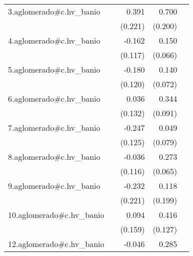 {\begin{longtable}{l*{4}{D{.}{.}{-1}}}
\addlinespace
3.aglomerado#c.hv\_banio&                     &       0.391         &       0.700\sym{***}&                     \\
            &                     &     (0.221)         &     (0.200)         &                     \\
\addlinespace
4.aglomerado#c.hv\_banio&                     &      -0.162         &       0.150\sym{*}  &                     \\
            &                     &     (0.117)         &     (0.066)         &                     \\
\addlinespace
5.aglomerado#c.hv\_banio&                     &      -0.180         &       0.140         &                     \\
            &                     &     (0.120)         &     (0.072)         &                     \\
\addlinespace
6.aglomerado#c.hv\_banio&                     &       0.036         &       0.344\sym{***}&                     \\
            &                     &     (0.132)         &     (0.091)         &                     \\
\addlinespace
7.aglomerado#c.hv\_banio&                     &      -0.247\sym{*}  &       0.049         &                     \\
            &                     &     (0.125)         &     (0.079)         &                     \\
\addlinespace
8.aglomerado#c.hv\_banio&                     &      -0.036         &       0.273\sym{***}&                     \\
            &                     &     (0.116)         &     (0.065)         &                     \\
\addlinespace
9.aglomerado#c.hv\_banio&                     &      -0.232         &       0.118         &                     \\
            &                     &     (0.221)         &     (0.199)         &                     \\
\addlinespace
10.aglomerado#c.hv\_banio&                     &       0.094         &       0.416\sym{**} &                     \\
            &                     &     (0.159)         &     (0.127)         &                     \\
\addlinespace
12.aglomerado#c.hv\_banio&                     &      -0.046         &       0.285\sym{*}  &                     \\

\end{longtable}}
